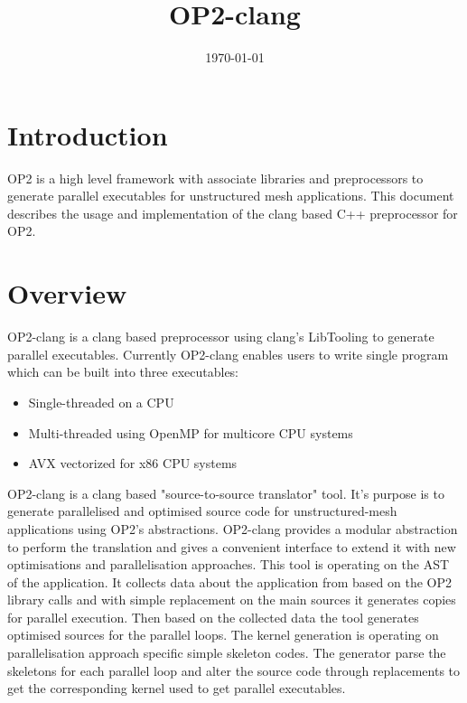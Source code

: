 \documentclass{article}
\title{OP2-clang}
\date{\today}
\author{}
\begin{document}
\maketitle

\newcommand{\optarget}{\textbf{OPTarget} }
\newcommand{\opRefToolHpp}{\textbf{OP2RefactoringTool.hpp} }
\newcommand{\opRefToolHppN}{\textbf{OP2RefactoringTool.hpp}}
\newcommand{\omp}{OpenMP }
\newcommand{\ompN}{OpenMP}
\tableofcontents

\section{Introduction}

OP2 is a high level framework with associate libraries and preprocessors to generate parallel executables for unstructured mesh applications. This document describes the usage and implementation of the clang based C++ preprocessor for OP2.



\section{Overview}
OP2-clang is a clang based preprocessor using clang's LibTooling to generate parallel executables. 
Currently OP2-clang enables users to write single program which can be built into three executables:
\begin{itemize}
    \item Single-threaded on a CPU
    \item Multi-threaded using \omp for multicore CPU systems
    \item AVX vectorized for x86 CPU systems
\end{itemize}

OP2-clang is a clang based "source-to-source translator" tool. It's purpose is to generate parallelised and optimised source code for unstructured-mesh applications using OP2's abstractions. OP2-clang provides a modular abstraction to perform the translation and gives a convenient interface to extend it with new optimisations and parallelisation approaches.
This tool is operating on the AST of the application. It collects data about the application from based on the OP2 library calls and with simple replacement on the main sources it generates copies for parallel execution. Then based on the collected data the tool generates optimised sources for the parallel loops. The kernel generation is operating on parallelisation approach specific simple skeleton codes. The generator parse the skeletons for each parallel loop and alter the source code through replacements to get the corresponding kernel used to get parallel executables.
\end{document}
